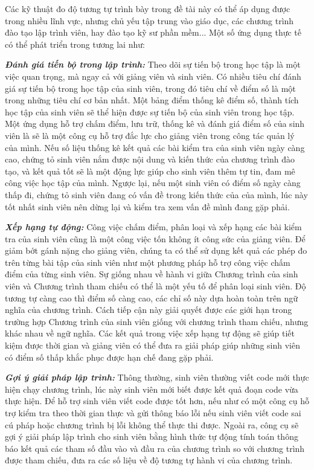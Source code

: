 Các kỹ thuật đo độ tương tự trình bày trong đề tài này có thể áp dụng
được trong nhiều lĩnh vực, nhưng chủ yếu tập trung vào giáo dục, các
chương trình đào tạo lập trình viên, hay đào tạo kỹ sư phần mềm... Một
số ứng dụng thực tế có thể phát triển trong tương lai như:

\textbf{\textit{Đánh giá tiến bộ trong lập trình:}} Theo dõi sự tiến
bộ trong học tập là một việc quan trọng, mà ngay cả với giảng viên và
sinh viên. Có nhiều tiêu chí đánh giá sự tiến bộ trong học tập của
sinh viên, trong đó tiêu chí về điểm số là một trong những tiêu chí cơ
bản nhất. Một bảng điểm thống kê điểm số, thành tích học tập của sinh
viên sẽ thể hiện được sự tiến bộ của sinh viên trong học tập. Một ứng
dụng hỗ trợ chấm điểm, lưu trữ, thống kê và đánh giá điểm số của sinh
viên là sẽ là một công cụ hỗ trợ đắc lực cho giảng viên trong công tác
quản lý của mình. Nếu số liệu thống kê kết quả các bài kiểm tra của
sinh viên ngày càng cao, chứng tỏ sinh viên nắm được nội dung và kiến
thức của chương trình đào tạo, và kết quả tốt sẽ là một động lực giúp
cho sinh viên thêm tự tin, đam mê công việc học tập của mình. Ngược
lại, nếu một sinh viên có điểm số ngày càng thấp đi, chứng tỏ sinh
viên đang có vấn đề trong kiến thức của của mình, lúc này tốt nhất
sinh viên nên dừng lại và kiểm tra xem vấn đề mình đang gặp phải.

\textit{\textbf{Xếp hạng tự động:}} Công việc chấm điểm, phân loại và
xếp hạng các bài kiểm tra của sinh viên cũng là một công việc tốn
không ít công sức của giảng viên. Để giảm bớt gánh nặng cho giảng
viên, chúng ta có thể sử dụng kết quả các phép đo trên từng bài tập
của sinh viên như một phương pháp hỗ trợ công việc chấm điểm của từng
sinh viên. Sự giống nhau về hành vi giữa Chương trình của sinh viên và
Chương trình tham chiếu có thể là một yếu tố để phân loại sinh
viên. Độ tương tự càng cao thì điểm số càng cao, các chỉ số này dựa
hoàn toàn trên ngữ nghĩa của chương trình. Cách tiếp cận này giải
quyết được các giới hạn trong trường hợp Chương trình của sinh viên
giống với chương trình tham chiếu, nhưng khác nhau về ngữ nghĩa. Các
kết quả trong việc xếp hạng tự động sẽ giúp tiết kiệm được thời gian
và giảng viên có thể đưa ra giải pháp giúp những sinh viên có điểm số
thấp khắc phục được hạn chế đang gặp phải.

\textit{\textbf{Gợi ý giải pháp lập trình:}} Thông thường, sinh viên
thường viết code mới thực hiện chạy chương trình, lúc này sinh viên
mới biết được kết quả đoạn code vừa thực hiện. Để hỗ trợ sinh viên
viết code được tốt hơn, nếu như có một công cụ hỗ trợ kiểm tra theo
thời gian thực và gửi thông báo lỗi nếu sinh viên viết code sai cú
pháp hoặc chương trình bị lỗi không thể thực thi được. Ngoài ra, công
cụ sẽ gợi ý giải pháp lập trình cho sinh viên bằng hình thức tự động
tính toán thông báo kết quả các tham số đầu vào và đầu ra của chương
trình so với chương trình được tham chiếu, đưa ra các số liệu về độ
tương tự hành vi của chương trình.

